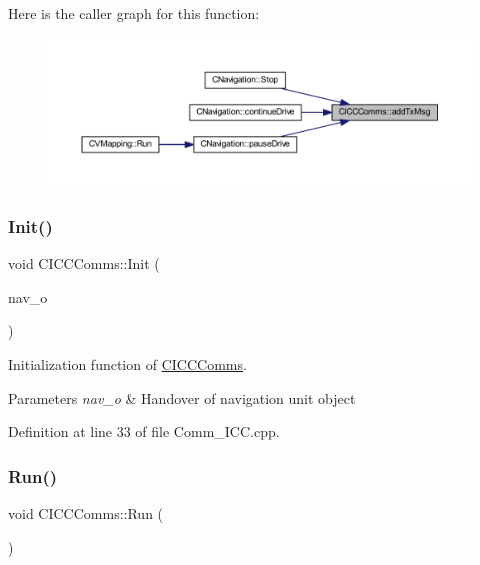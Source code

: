 Here is the caller graph for this function\+:\nopagebreak
\begin{figure}[H]
\begin{center}
\leavevmode
\includegraphics[width=350pt]{class_c_i_c_c_comms_ab925dd7ff82f30ccd9f770ab2281b3ab_icgraph}
\end{center}
\end{figure}
\mbox{\label{class_c_i_c_c_comms_ad1d35d2145363d2ab970f9f5cd1dfc23}} 
\subsubsection{\texorpdfstring{Init()}{Init()}}
{\footnotesize\ttfamily void C\+I\+C\+C\+Comms\+::\+Init (\begin{DoxyParamCaption}\item[{\mbox{\hyperlink{class_c_navigation}{C\+Navigation}} $\ast$}]{nav\+\_\+o }\end{DoxyParamCaption})\hspace{0.3cm}{\ttfamily [virtual]}}



Initialization function of \mbox{\hyperlink{class_c_i_c_c_comms}{C\+I\+C\+C\+Comms}}. 


\begin{DoxyParams}{Parameters}
{\em nav\+\_\+o} & Handover of navigation unit object \\
\hline
\end{DoxyParams}


Definition at line 33 of file Comm\+\_\+\+I\+C\+C.\+cpp.

\mbox{\label{class_c_i_c_c_comms_a8b3fa81307b3b9ba0e72b4aee8279c56}} 
\subsubsection{\texorpdfstring{Run()}{Run()}}
{\footnotesize\ttfamily void C\+I\+C\+C\+Comms\+::\+Run (\begin{DoxyParamCaption}\item[{void}]{ }\end{DoxyParamCaption})\hspace{0.3cm}{\ttfamily [virtual]}}



